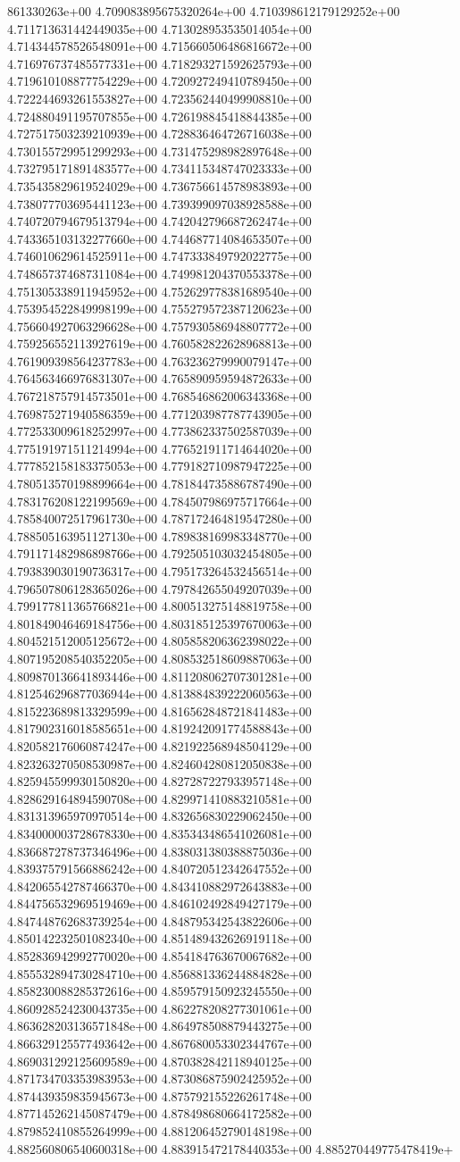 861330263e+00	4.709083895675320264e+00	4.710398612179129252e+00	4.711713631442449035e+00	4.713028953535014054e+00	4.714344578526548091e+00	4.715660506486816672e+00	4.716976737485577331e+00	4.718293271592625793e+00	4.719610108877754229e+00	4.720927249410789450e+00	4.722244693261553827e+00	4.723562440499908810e+00	4.724880491195707855e+00	4.726198845418844385e+00	4.727517503239210939e+00	4.728836464726716038e+00	4.730155729951299293e+00	4.731475298982897648e+00	4.732795171891483577e+00	4.734115348747023333e+00	4.735435829619524029e+00	4.736756614578983893e+00	4.738077703695441123e+00	4.739399097038928588e+00	4.740720794679513794e+00	4.742042796687262474e+00	4.743365103132277660e+00	4.744687714084653507e+00	4.746010629614525911e+00	4.747333849792022775e+00	4.748657374687311084e+00	4.749981204370553378e+00	4.751305338911945952e+00	4.752629778381689540e+00	4.753954522849998199e+00	4.755279572387120623e+00	4.756604927063296628e+00	4.757930586948807772e+00	4.759256552113927619e+00	4.760582822628968813e+00	4.761909398564237783e+00	4.763236279990079147e+00	4.764563466976831307e+00	4.765890959594872633e+00	4.767218757914573501e+00	4.768546862006343368e+00	4.769875271940586359e+00	4.771203987787743905e+00	4.772533009618252997e+00	4.773862337502587039e+00	4.775191971511214994e+00	4.776521911714644020e+00	4.777852158183375053e+00	4.779182710987947225e+00	4.780513570198899664e+00	4.781844735886787490e+00	4.783176208122199569e+00	4.784507986975717664e+00	4.785840072517961730e+00	4.787172464819547280e+00	4.788505163951127130e+00	4.789838169983348770e+00	4.791171482986898766e+00	4.792505103032454805e+00	4.793839030190736317e+00	4.795173264532456514e+00	4.796507806128365026e+00	4.797842655049207039e+00	4.799177811365766821e+00	4.800513275148819758e+00	4.801849046469184756e+00	4.803185125397670063e+00	4.804521512005125672e+00	4.805858206362398022e+00	4.807195208540352205e+00	4.808532518609887063e+00	4.809870136641893446e+00	4.811208062707301281e+00	4.812546296877036944e+00	4.813884839222060563e+00	4.815223689813329599e+00	4.816562848721841483e+00	4.817902316018585651e+00	4.819242091774588843e+00	4.820582176060874247e+00	4.821922568948504129e+00	4.823263270508530987e+00	4.824604280812050838e+00	4.825945599930150820e+00	4.827287227933957148e+00	4.828629164894590708e+00	4.829971410883210581e+00	4.831313965970970514e+00	4.832656830229062450e+00	4.834000003728678330e+00	4.835343486541026081e+00	4.836687278737346496e+00	4.838031380388875036e+00	4.839375791566886242e+00	4.840720512342647552e+00	4.842065542787466370e+00	4.843410882972643883e+00	4.844756532969519469e+00	4.846102492849427179e+00	4.847448762683739254e+00	4.848795342543822606e+00	4.850142232501082340e+00	4.851489432626919118e+00	4.852836942992770020e+00	4.854184763670067682e+00	4.855532894730284710e+00	4.856881336244884828e+00	4.858230088285372616e+00	4.859579150923245550e+00	4.860928524230043735e+00	4.862278208277301061e+00	4.863628203136571848e+00	4.864978508879443275e+00	4.866329125577493642e+00	4.867680053302344767e+00	4.869031292125609589e+00	4.870382842118940125e+00	4.871734703353983953e+00	4.873086875902425952e+00	4.874439359835945673e+00	4.875792155226261748e+00	4.877145262145087479e+00	4.878498680664172582e+00	4.879852410855264999e+00	4.881206452790148198e+00	4.882560806540600318e+00	4.883915472178440353e+00	4.885270449775478419e+